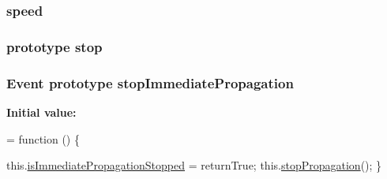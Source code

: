 \subsubsection[{\texorpdfstring{speed}{speed}}]{ speed}\hypertarget{jquery-2_82_81-vsdoc_8js_add98c90065e6563cba26ff6d2016c46c}{}\label{jquery-2_82_81-vsdoc_8js_add98c90065e6563cba26ff6d2016c46c}
\subsubsection[{\texorpdfstring{stop}{stop}}]{ {\bf prototype} stop}\hypertarget{jquery-2_82_81-vsdoc_8js_a15a54c91540296e335556d3209094768}{}\label{jquery-2_82_81-vsdoc_8js_a15a54c91540296e335556d3209094768}
\subsubsection[{\texorpdfstring{stop\+Immediate\+Propagation}{stopImmediatePropagation}}]{ {\bf Event} {\bf prototype} stop\+Immediate\+Propagation}\hypertarget{jquery-2_82_81-vsdoc_8js_a41ea733f6d1de22b59b62cac632d0180}{}\label{jquery-2_82_81-vsdoc_8js_a41ea733f6d1de22b59b62cac632d0180}
{\bfseries Initial value\+:}
\begin{DoxyCode}
= \textcolor{keyword}{function} () \{
        

        this.\hyperlink{jquery-2_82_81-vsdoc_8js_a5fe8157d3a55c7b444e8d97b9dcde6a8}{isImmediatePropagationStopped} = returnTrue;
        this.\hyperlink{jquery-2_82_81-vsdoc_8js_ad7254bed2a2157174df61645464ed6b7}{stopPropagation}();
    \}
\end{DoxyCode}
